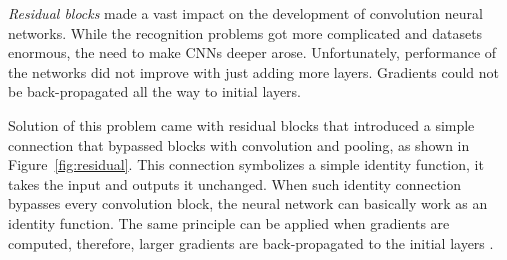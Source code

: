 


\textit{Residual blocks} made a vast impact on the development of convolution neural networks. While the recognition problems got more complicated and datasets enormous, the need to make CNNs deeper arose. Unfortunately, performance of the networks did not improve with just adding more layers. Gradients could not be back-propagated all the way to initial layers.

Solution of this problem came with residual blocks that introduced a simple connection that bypassed blocks with convolution and pooling, as shown in Figure~\ref{fig:residual}. This connection symbolizes a simple identity function, it takes the input and outputs it unchanged. When such identity connection bypasses every convolution block, the neural network can basically work as an identity function. The same principle can be applied when gradients are computed, therefore, larger gradients are back-propagated to the initial layers \cite{he2015deep-resnet}.

